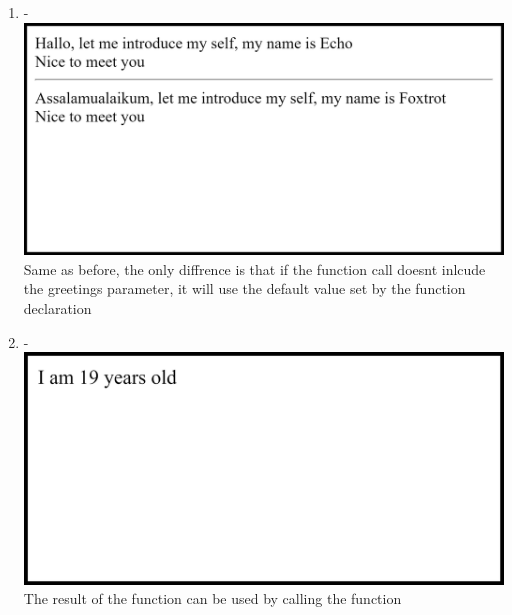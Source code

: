 \documentclass[12pt,titlepage]{article}
\begin{document}
\begin{enumerate}
    \item - \\ \includegraphics[width=.9\textwidth]{images/figures/fig6.png} \\ Same as before, the only diffrence is that if the function call doesnt inlcude the greetings parameter, it will use the default value set by the function declaration 
    \item - \\ \includegraphics[width=.9\textwidth]{images/figures/fig7.png} \\ The result of the function can be used by calling the function
    
    \newpage
    

\end{enumerate}
\end{document}
